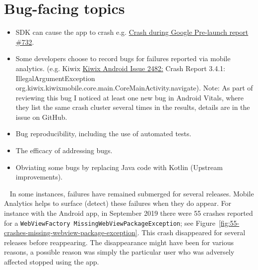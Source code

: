 \section{Bug-facing topics}
\begin{itemize}
    \itemsep0em 
    \item SDK can cause the app to crash e.g. \href{https://github.com/segmentio/analytics-android/issues/732}{Crash during Google Pre-launch report \#732}.
    \item Some developers choose to record bugs for failures reported via mobile analytics. (e.g. Kiwix \href{https://github.com/kiwix/kiwix-android/issues/2482}{Kiwix Android Issue 2482:} Crash Report 3.4.1: IllegalArgumentException org.kiwix.kiwixmobile.core.main.CoreMainActivity.navigate). Note: As part of reviewing this bug I noticed at least one new bug in Android Vitals, where they list the same crash cluster several times in the results, details are in the issue on GitHub.
    \item Bug reproducibility, including the use of automated tests.
    \item The efficacy of addressing bugs.
    \item Obviating some bugs by replacing Java code with Kotlin (Upstream improvements).
\end{itemize}

~\label{section-intermittent-appearances-of-bugs-55-crashes}
In some instances, failures have remained submerged for several releases. Mobile Analytics helps to surface (detect) these failures when they do appear. 
For instance with the  Android app, in September 2019 there were 55 crashes reported for a \texttt{WebViewFactory MissingWebViewPackageException}; see Figure~\ref{fig:55-crashes-missing-webview-package-exception}. This crash disappeared for several releases before reappearing. The disappearance might have been for various reasons, a possible reason was simply the particular user who was adversely affected stopped using the app. 

